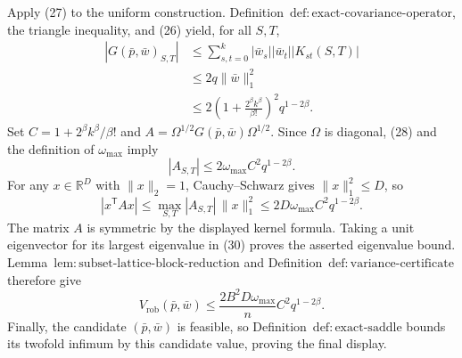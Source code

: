 Apply (27) to the uniform construction.  Definition~\(\mathrm{def{:}exact\text{-}covariance\text{-}operator}\), the triangle inequality, and (26) yield, for all \(S,T\),
\[
\begin{aligned}
|G(\bar p,\bar w)_{S,T}|
&\le\sum_{s,t=0}^k|\bar w_s||\bar w_t||K_{st}(S,T)|\\
&\le2q\|\bar w\|_1^2\\
&\le2\left(1+\frac{2^\beta k^\beta}{\beta!}\right)^2q^{1-2\beta}.
\end{aligned}
\tag{28}
\]
Set \(C=1+2^\beta k^\beta/\beta!\) and \(A=\Omega^{1/2}G(\bar p,\bar w)\Omega^{1/2}\).  Since \(\Omega\) is diagonal, (28) and the definition of \(\omega_{\max}\) imply
\[
|A_{S,T}|\le2\omega_{\max}C^2q^{1-2\beta}.
\tag{29}
\]
For any \(x\in\mathbb R^D\) with \(\|x\|_2=1\), Cauchy--Schwarz gives \(\|x\|_1^2\le D\), so
\[
|x^{\mathsf T}Ax|
\le\max_{S,T}|A_{S,T}|\,\|x\|_1^2
\le2D\omega_{\max}C^2q^{1-2\beta}.
\tag{30}
\]
The matrix \(A\) is symmetric by the displayed kernel formula.  Taking a unit eigenvector for its largest eigenvalue in (30) proves the asserted eigenvalue bound.  Lemma~\(\mathrm{lem{:}subset\text{-}lattice\text{-}block\text{-}reduction}\) and Definition~\(\mathrm{def{:}variance\text{-}certificate}\) therefore give
\[
V_{\mathrm{rob}}(\bar p,\bar w)
\le\frac{2B^2D\omega_{\max}}{n}C^2q^{1-2\beta}.
\]
Finally, the candidate \((\bar p,\bar w)\) is feasible, so Definition~\(\mathrm{def{:}exact\text{-}saddle}\) bounds its twofold infimum by this candidate value, proving the final display.